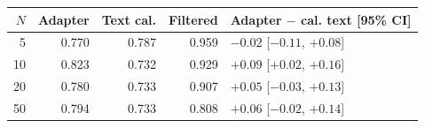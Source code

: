 \begin{tabular}{rrrrl}
\toprule
$N$ & Adapter & Text cal. & Filtered & Adapter $-$ cal. text [95\% CI] \\
\midrule
5 & 0.770 & 0.787 & 0.959 & $-0.02$ [$-0.11$, $+0.08$] \\
10 & 0.823 & 0.732 & 0.929 & $+0.09$ [$+0.02$, $+0.16$] \\
20 & 0.780 & 0.733 & 0.907 & $+0.05$ [$-0.03$, $+0.13$] \\
50 & 0.794 & 0.733 & 0.808 & $+0.06$ [$-0.02$, $+0.14$] \\
\bottomrule
\end{tabular}
